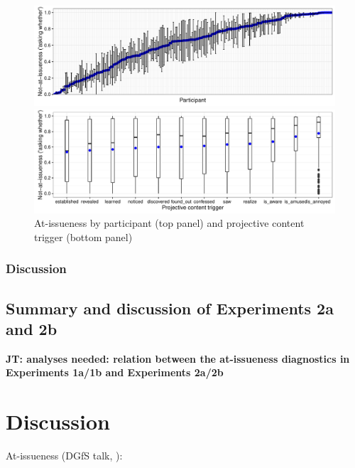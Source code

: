 \documentclass[11pt,fleqn]{article}
\newcommand{\6}{\mbox{$[\hspace*{-.6mm}[$}}
\newcommand{\9}{\mbox{$]\hspace*{-.6mm}]$}}
\newcommand{\jt}[1]{\textbf{\color{blue}JT: #1}}
\begin{document}
\begin{figure}[!h]
\begin{center}

\includegraphics[width=16cm]{../results/exp2b/graphs/ai-subjectmeans}

\includegraphics[width=16cm]{../results/exp2b/graphs/boxplot-not-at-issueness}

\end{center}
\caption{At-issueness by participant (top panel) and projective content trigger (bottom panel)}
\label{f-ai-2b}
\end{figure}

\subsubsection{Discussion}

\subsection{Summary and discussion of Experiments 2a and 2b}

\jt{analyses needed: relation between the at-issueness diagnostics in Experiments 1a/1b and Experiments 2a/2b}

\section{Discussion}\label{s5}

At-issueness (DGfS talk, \citealt{tonhauser-dgfs2017}):
\end{document}
